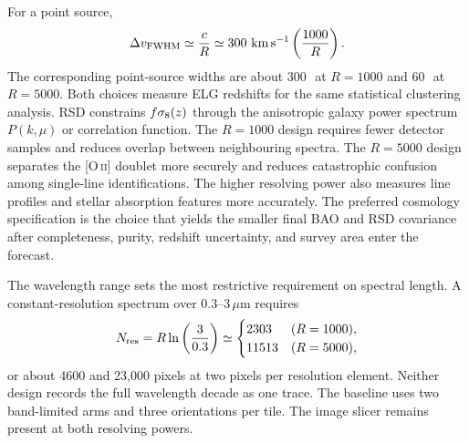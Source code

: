 For a point source,
\begin{equation}
  \Delta v_{\rm FWHM}\simeq \frac{c}{R}
  \simeq 300\ {\rm km\,s^{-1}}\left(\frac{1000}{R}\right).
\end{equation}
The corresponding point-source widths are about $300$\,\kms\ at $R=1000$ and $60$\,\kms\ at $R=5000$. Both choices measure ELG redshifts for the same statistical clustering analysis. RSD constrains $f\sigma_8(z)$ through the anisotropic galaxy power spectrum $P(k,\mu)$ or correlation function. The $R=1000$ design requires fewer detector samples and reduces overlap between neighbouring spectra. The $R=5000$ design separates the [O\,\textsc{ii}] doublet more securely and reduces catastrophic confusion among single-line identifications. The higher resolving power also measures line profiles and stellar absorption features more accurately. The preferred cosmology specification is the choice that yields the smaller final BAO and RSD covariance after completeness, purity, redshift uncertainty, and survey area enter the forecast.

The wavelength range sets the most restrictive requirement on spectral length. A constant-resolution spectrum over 0.3--3\,$\mu$m requires
\begin{equation}
  N_{\rm res}=R\ln\left(\frac{3}{0.3}\right)
  \simeq
  \begin{cases}
  2303 & (R=1000),\\
  11513 & (R=5000),
  \end{cases}
\end{equation}
or about 4600 and 23,000 pixels at two pixels per resolution element. Neither design records the full wavelength decade as one trace. The baseline uses two band-limited arms and three orientations per tile. The image slicer remains present at both resolving powers.

